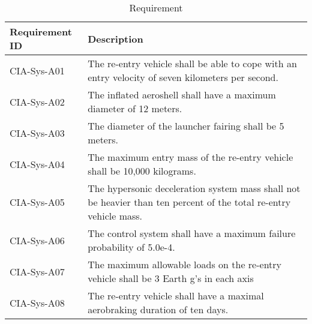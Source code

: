 \begin{table}[H]
	\caption{Requirement}
	\begin{tabular}{|p{}|p{}|}
    \hline
    Requirement ID          & Description                                                                                                      \\ \hline \hline
    CIA-Sys-A01 & The re-entry vehicle shall be able to cope with an entry velocity of seven kilometers per second.                \\ \hline
    CIA-Sys-A02 & The inflated aeroshell shall have a maximum diameter of 12 meters.                                               \\ \hline
    CIA-Sys-A03 & The diameter of the launcher fairing shall be 5 meters.                                                          \\ \hline
    CIA-Sys-A04 & The maximum entry mass of the re-entry vehicle shall be 10,000 kilograms.                                         \\ \hline
    CIA-Sys-A05 & The hypersonic deceleration system mass shall not be heavier than ten percent of the total re-entry vehicle mass. \\ \hline
    CIA-Sys-A06 & The control system shall have a maximum failure probability of 5.0e-4.                                           \\ \hline
    CIA-Sys-A07 & The maximum allowable loads on the re-entry vehicle shall be 3 Earth g's in each axis                            \\ \hline
    CIA-Sys-A08 & The re-entry vehicle shall have a maximal aerobraking duration of ten days.                                      \\ \hline
    \end{tabular}
    \label{tab:requirements}
\end{table}

